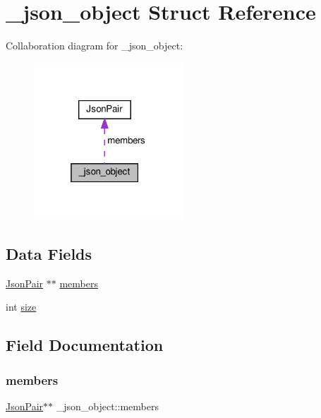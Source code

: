 \hypertarget{struct__json__object}{}\section{\+\_\+json\+\_\+object Struct Reference}
\label{struct__json__object}


Collaboration diagram for \+\_\+json\+\_\+object\+:\nopagebreak
\begin{figure}[H]
\begin{center}
\leavevmode
\includegraphics[width=160pt]{struct__json__object__coll__graph}
\end{center}
\end{figure}
\subsection*{Data Fields}
\begin{DoxyCompactItemize}
\item 
\hyperlink{structJsonPair}{Json\+Pair} $\ast$$\ast$ \hyperlink{struct__json__object_a61878c36cde83d313c094bb7b2a246f0}{members}
\item 
int \hyperlink{struct__json__object_a9a4c68b8224ec222391597f4e27ea447}{size}
\end{DoxyCompactItemize}


\subsection{Field Documentation}
\mbox{\label{struct__json__object_a61878c36cde83d313c094bb7b2a246f0}} 
\subsubsection{\texorpdfstring{members}{members}}
{\footnotesize\ttfamily \hyperlink{structJsonPair}{Json\+Pair}$\ast$$\ast$ \+\_\+json\+\_\+object\+::members}


